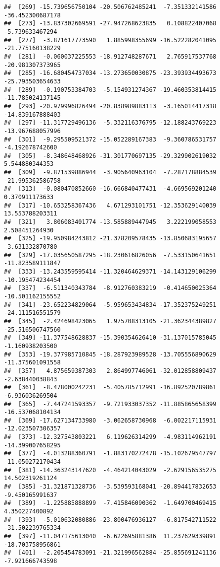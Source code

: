 \documentclass[
]{article}
\begin{document}
\begin{verbatim}
##  [269] -15.739656750104 -20.506762485241  -7.351332141586 -36.452300687178
##  [273] -13.837302669591 -27.947268623835   0.108822407068  -5.739633467294
##  [277]  -3.871617773590   1.885998355699 -16.522282041095 -21.775160138229
##  [281]  -0.060037225553 -18.912748287671   2.765917537768 -20.981307373965
##  [285] -16.680454737034 -13.273650030875 -23.393934493673 -25.793503654633
##  [289]  -0.190753384703  -5.154931274367 -19.460353814415 -11.785024137145
##  [293] -20.979996826494 -20.838989883113  -3.165014417318 -14.839167888403
##  [297] -11.317729496136  -5.332116376795 -12.188243769223 -13.967688057996
##  [301]  -9.295509521372 -15.052289167383  -9.360786531757  -4.192678742600
##  [305]  -8.348648468926 -31.301770697135 -29.329902619032   5.544880344353
##  [309]  -9.871539886944  -3.905640963104  -7.287178884539 -21.995362586758
##  [313]  -0.080470852660 -16.666840477431  -4.669569201240   0.370911173633
##  [317] -10.653258367436   4.671293101751 -12.353629140039  13.553788203311
##  [321]   3.806083401774 -13.585889447945   3.222199058553   2.508451264930
##  [325] -19.950984243812 -21.378209578435 -13.850683195657  -3.631332870780
##  [329] -17.035650587295 -18.230616826056  -7.533150641651 -11.823589111847
##  [333] -13.243559595414 -11.320464629371 -14.143129106299 -10.195474234454
##  [337]  -6.511340343784  -8.912760383219  -0.414650025364 -10.501162155552
##  [341] -23.652234829064  -5.959653434834 -17.352375249251 -24.111516551579
##  [345]  -2.424698423065   1.975708313105 -21.362344389827 -25.516506747560
##  [349] -11.377548628837 -15.390354626410 -31.137015785045  -1.160938203500
##  [353] -19.377985710845 -18.287923989528 -13.705556890629 -11.375601091558
##  [357]   4.875659387303   2.864997746061 -32.012858809437  -2.638440038843
##  [361]  -8.478000242231  -5.405785712991 -16.892520789861  -6.936036269504
##  [365]  -7.447241593357  -9.721933037352 -11.885865658399 -16.537068104134
##  [369] -17.627134733980  -3.062658730968  -6.002217115931 -12.023507306357
##  [373] -12.327543803221   6.119626314299  -4.983114962191 -14.399007658295
##  [377]  -4.013288360791  -1.883170272478 -15.102679547797 -11.050272170434
##  [381] -14.363243147620  -4.464214043029  -2.629156535275  14.502319261124
##  [385] -31.321871328736  -3.539593168041 -20.894417832653  -9.450165991637
##  [389]  -1.225885888899  -7.415846090362  -1.649700469415   4.350227400892
##  [393]  -5.010632080886 -23.800476936127  -6.817542711522 -31.502239765334
##  [397] -11.047175613040  -6.622695881386  11.237629339891 -18.703758956861
##  [401]  -2.205454783091 -21.321996562884 -25.855691241136  -7.921666743598

\end{verbatim}
\end{document}
